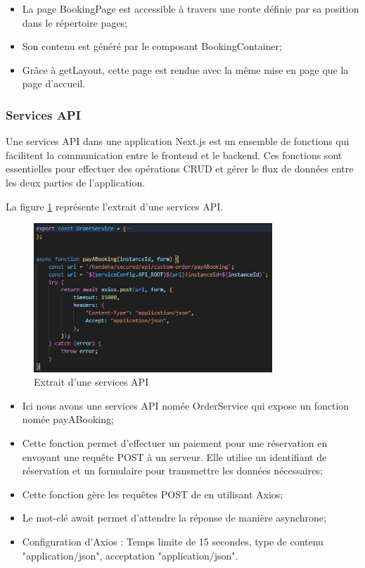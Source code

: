\documentclass[12pt]{report}
\begin{document}
			\begin{itemize}
				\item La page BookingPage est accessible à travers une route définie par sa position dans le répertoire pages;
				\item Son contenu est généré par le composant BookingContainer;
				\item Grâce à getLayout, cette page est rendue avec la même mise en page que la page d'accueil.
 			\end{itemize}

			\subsubsection{Services API}

			\hspace{15pt} Une services API dans une application Next.js est un ensemble de fonctions qui facilitent la communication entre le frontend et le backend. Ces fonctions sont essentielles pour effectuer des opérations CRUD et gérer le flux de données entre les deux parties de l'application.

			La figure \ref{fig:serviceAPI} représente l'extrait d'une services API.
			
			\begin{figure}[h]
				\centering
				\includegraphics[width=0.8\textwidth]{serviceAPI.jpg}
				\caption{Extrait d'une services API}
				\label{fig:serviceAPI}
			\end{figure}
			\FloatBarrier

			\begin{itemize}
				\item Ici nous avons une services API nomée OrderService qui expose un fonction nomée payABooking;
				\item Cette fonction permet d'effectuer un paiement pour une réservation en envoyant une requête POST à un serveur. Elle utilise un identifiant de réservation et un formulaire pour transmettre les données nécessaires;
				\item Cette fonction gère les requêtes POST de en utilisant Axios;
				\item Le mot-clé await permet d'attendre la réponse de manière asynchrone;	
				\item Configuration d’Axios : Temps limite de 15 secondes, type de contenu "application/json", acceptation "application/json".
			\end{itemize}
			
\end{document}
